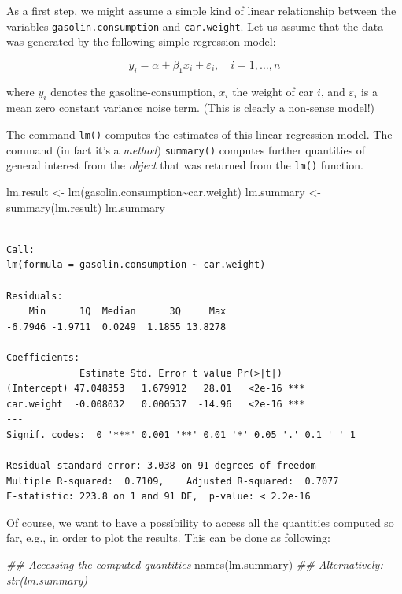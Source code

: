 \documentclass[
  letterpaper,
  DIV=11,
  numbers=noendperiod]{scrreprt}
\newenvironment{Shaded}{\begin{snugshade}}{\end{snugshade}}
\newcommand{\DocumentationTok}[1]{\textcolor[rgb]{0.37,0.37,0.37}{\textit{#1}}}
\newcommand{\FunctionTok}[1]{\textcolor[rgb]{0.28,0.35,0.67}{#1}}
\newcommand{\NormalTok}[1]{\textcolor[rgb]{0.00,0.23,0.31}{#1}}
\newcommand{\OtherTok}[1]{\textcolor[rgb]{0.00,0.23,0.31}{#1}}
\newcommand{\SpecialCharTok}[1]{\textcolor[rgb]{0.37,0.37,0.37}{#1}}
\theoremstyle{definition}
\theoremstyle{plain}
\theoremstyle{plain}
\theoremstyle{remark}
\begin{document}
As a first step, we might assume a simple kind of linear relationship
between the variables \texttt{gasolin.consumption} and
\texttt{car.weight}. Let us assume that the data was generated by the
following simple regression model:

\[
y_i=\alpha+\beta_1 x_i+\varepsilon_i,\quad i=1,\dots,n
\]

where \(y_i\) denotes the gasoline-consumption, \(x_i\) the weight of
car \(i\), and \(\varepsilon_i\) is a mean zero constant variance noise
term. (This is clearly a non-sense model!)

The command \texttt{lm()} computes the estimates of this linear
regression model. The command (in fact it's a \emph{method})
\texttt{summary()} computes further quantities of general interest from
the \emph{object} that was returned from the \texttt{lm()} function.

\begin{Shaded}
\begin{Highlighting}[]
\NormalTok{lm.result   }\OtherTok{\textless{}{-}} \FunctionTok{lm}\NormalTok{(gasolin.consumption}\SpecialCharTok{\textasciitilde{}}\NormalTok{car.weight)}
\NormalTok{lm.summary  }\OtherTok{\textless{}{-}} \FunctionTok{summary}\NormalTok{(lm.result)}
\NormalTok{lm.summary}
\end{Highlighting}
\end{Shaded}

\begin{verbatim}

Call:
lm(formula = gasolin.consumption ~ car.weight)

Residuals:
    Min      1Q  Median      3Q     Max 
-6.7946 -1.9711  0.0249  1.1855 13.8278 

Coefficients:
             Estimate Std. Error t value Pr(>|t|)    
(Intercept) 47.048353   1.679912   28.01   <2e-16 ***
car.weight  -0.008032   0.000537  -14.96   <2e-16 ***
---
Signif. codes:  0 '***' 0.001 '**' 0.01 '*' 0.05 '.' 0.1 ' ' 1

Residual standard error: 3.038 on 91 degrees of freedom
Multiple R-squared:  0.7109,    Adjusted R-squared:  0.7077 
F-statistic: 223.8 on 1 and 91 DF,  p-value: < 2.2e-16
\end{verbatim}

\hfill\break

Of course, we want to have a possibility to access all the quantities
computed so far, e.g., in order to plot the results. This can be done as
following:

\begin{Shaded}
\begin{Highlighting}[]
\DocumentationTok{\#\# Accessing the computed quantities}
\FunctionTok{names}\NormalTok{(lm.summary) }\DocumentationTok{\#\# Alternatively: str(lm.summary)}
\end{Highlighting}
\end{Shaded}
\end{document}
